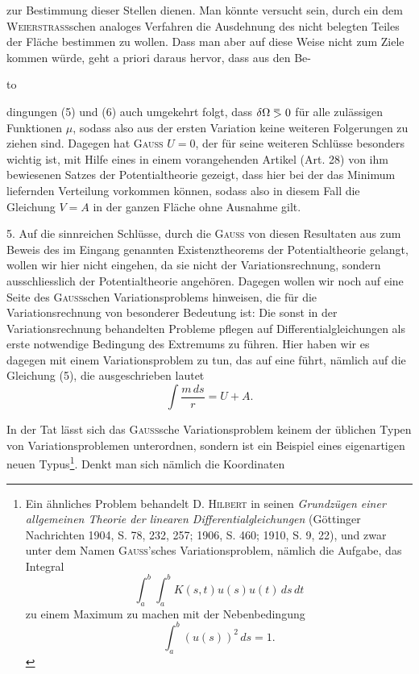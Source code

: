 zur Bestimmung dieser Stellen dienen. Man könnte versucht sein, durch ein
dem \textsc{Weierstrass}schen analoges Verfahren die Ausdehnung des nicht belegten
Teiles der Fläche bestimmen zu wollen. Dass man aber auf diese Weise nicht
zum Ziele kommen würde, geht a priori daraus hervor, dass aus den Be\mbox{-}
\par\noindent\hbox to\par
\clearpage{}
\noindent dingungen (5) und (6) auch umgekehrt folgt, dass $\delta\Omega\BolzaEqualAboveGreater0$ für alle zulässigen
Funktionen $\mu$, sodass also aus der ersten Variation keine weiteren Folgerungen
zu ziehen sind. Dagegen hat \textsc{Gauss}  $U=0$, der
für seine weiteren Schlüsse besonders wichtig ist, mit Hilfe eines in einem
vorangehenden Artikel (Art. 28) von ihm bewiesenen Satzes der Potentialtheorie
gezeigt, dass hier bei der das Minimum liefernden Verteilung  vorkommen können, sodass also in
diesem Fall die Gleichung $V=A$ in der ganzen Fläche ohne Ausnahme gilt.
\par\noindent\hspace*{\parindent}5. Auf die sinnreichen Schlüsse, durch die \textsc{Gauss} von diesen Resultaten
aus zum Beweis des im Eingang genannten Existenztheorems der Potentialtheorie gelangt, wollen wir hier nicht eingehen, da sie nicht der Variationsrechnung, sondern ausschliesslich der Potentialtheorie angehören. Dagegen
wollen wir noch auf eine Seite des \textsc{Gauss}schen Variationsproblems hinweisen,
die für die Variationsrechnung von besonderer Bedeutung ist: Die sonst in der
Variationsrechnung behandelten Probleme pflegen auf Differentialgleichungen
als erste notwendige Bedingung des Extremums zu führen. Hier haben wir
es dagegen mit einem Variationsproblem zu tun, das auf eine  führt, nämlich auf die Gleichung (5), die ausgeschrieben lautet
\[
\int\frac{m\,ds}{r}=U+A.
\]
\par\noindent\hspace*{\parindent}In der Tat lässt sich das \textsc{Gauss}sche Variationsproblem keinem der üblichen Typen von Variationsproblemen unterordnen, sondern ist ein Beispiel
eines eigenartigen neuen Typus\footnote{Ein ähnliches Problem behandelt D. \textsc{Hilbert} in seinen \textit{Grundzügen einer allgemeinen Theorie
der linearen Differentialgleichungen} (Göttinger Nachrichten 1904, S. 78, 232, 257; 1906, S. 460; 1910, S. 9,
22), und zwar unter dem Namen \textsc{Gauss}'sches Variationsproblem, nämlich die Aufgabe, das Integral
\[
\int_a^b\int_a^b K(s,t)u(s)u(t)\,ds\,dt
\]
zu einem Maximum zu machen mit der Nebenbedingung
\[
\int_a^b(u(s))^2\,ds=1.
\]
}. Denkt man sich nämlich die Koordinaten
